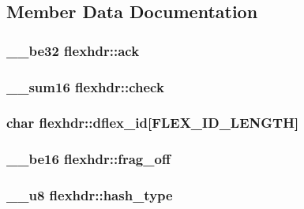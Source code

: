 \subsection{Member Data Documentation}
\subsubsection[{\texorpdfstring{ack}{ack}}]{\setlength{\rightskip}{0pt plus 5cm}\+\_\+\+\_\+be32 flexhdr\+::ack}\hypertarget{structflexhdr_a9504db4a12b79baa7937e1d11f521e57}{}\label{structflexhdr_a9504db4a12b79baa7937e1d11f521e57}
\subsubsection[{\texorpdfstring{check}{check}}]{\setlength{\rightskip}{0pt plus 5cm}\+\_\+\+\_\+sum16 flexhdr\+::check}\hypertarget{structflexhdr_a7e2d0c232c92ea39204ec52563cbd33e}{}\label{structflexhdr_a7e2d0c232c92ea39204ec52563cbd33e}
\subsubsection[{\texorpdfstring{dflex\+\_\+id}{dflex_id}}]{\setlength{\rightskip}{0pt plus 5cm}char flexhdr\+::dflex\+\_\+id\mbox{[}{\bf F\+L\+E\+X\+\_\+\+I\+D\+\_\+\+L\+E\+N\+G\+TH}\mbox{]}}\hypertarget{structflexhdr_aab2628ec55f6dedda9cd48de1677d49c}{}\label{structflexhdr_aab2628ec55f6dedda9cd48de1677d49c}
\subsubsection[{\texorpdfstring{frag\+\_\+off}{frag_off}}]{\setlength{\rightskip}{0pt plus 5cm}\+\_\+\+\_\+be16 flexhdr\+::frag\+\_\+off}\hypertarget{structflexhdr_a85f045e7acaf63edb2cd192266ef49bf}{}\label{structflexhdr_a85f045e7acaf63edb2cd192266ef49bf}
\subsubsection[{\texorpdfstring{hash\+\_\+type}{hash_type}}]{\setlength{\rightskip}{0pt plus 5cm}\+\_\+\+\_\+u8 flexhdr\+::hash\+\_\+type}\hypertarget{structflexhdr_aa2a7292e9ff348680f83067955b58d0f}{}\label{structflexhdr_aa2a7292e9ff348680f83067955b58d0f}
